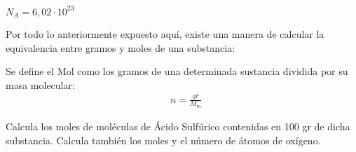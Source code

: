 \begin{center}
$N_A=6,02\cdot10^{23}$
\end{center}
Por todo lo anteriormente expuesto aquí, existe una manera de calcular la equivalencia entre gramos y moles de una substancia:

\begin{definition}
	Se define el Mol como los gramos de una determinada sustancia dividida por su masa molecular:
	\begin{align}
		& n=\frac{gr}{M_m}
	\end{align}
\end{definition}

\begin{exercise}
	Calcula los moles de moléculas de Ácido Sulfúrico contenidas en 100 gr de dicha substancia. Calcula también los moles y el número de átomos de oxígeno.
	
\end{exercise}